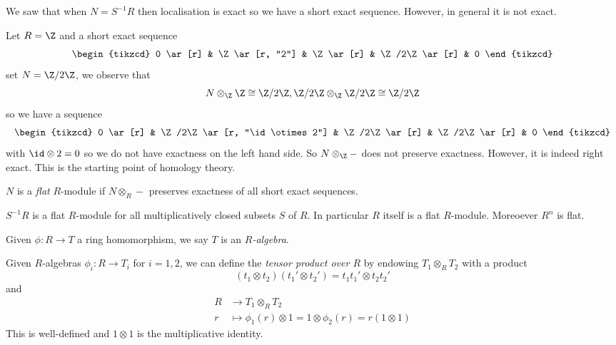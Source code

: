 \documentclass[a4paper]{article}
\begin{document}
We saw that when \(N = S^{-1}R\) then localisation is exact so we have a short exact sequence. However, in general it is not exact.

\begin{eg}
  Let \(R = \Z\) and a short exact sequence
  \[
    \begin{tikzcd}
      0 \ar[r] & \Z \ar[r, "2"] & \Z \ar[r] & \Z/2\Z \ar[r] & 0
    \end{tikzcd}
  \]
  set \(N = \Z/2\Z\), we observe that
  \[
    N \otimes_\Z \Z \cong \Z/2\Z, \Z/2\Z \otimes_\Z \Z/2\Z \cong \Z/2\Z
  \]
  so we have a sequence
  \[
    \begin{tikzcd}
      0 \ar[r] & \Z/2\Z \ar[r, "\id \otimes 2"] & \Z/2\Z \ar[r] & \Z/2\Z \ar[r] & 0
    \end{tikzcd}
  \]
  with \(\id \otimes 2 = 0\) so we do not have exactness on the left hand side. So \(N \otimes_\Z -\) does not preserve exactness. However, it is indeed right exact. This is the starting point of homology theory.
\end{eg}

\begin{definition}
  \(N\) is a \emph{flat} \(R\)-module if \(N \otimes_R -\) preserves exactness of all short exact sequences.
\end{definition}

\begin{eg}
  \(S^{-1}R\) is a flat \(R\)-module for all multiplicatively closed subsets \(S\) of \(R\). In particular \(R\) itself is a flat \(R\)-module. Moreoever \(R^n\) is flat.
\end{eg}

\begin{definition}[algebra]
  Given \(\phi: R \to T\) a ring homomorphism, we say \(T\) is an \emph{\(R\)-algebra}.
\end{definition}

\begin{definition}
  Given \(R\)-algebras \(\phi_i: R \to T_i\) for \(i = 1, 2\), we can define the \emph{tensor product over \(R\)} by endowing \(T_1 \otimes_R T_2\) with a product
  \[
    (t_1 \otimes t_2) (t_1' \otimes t_2') = t_1t_1' \otimes t_2t_2'
  \]
  and
  \begin{align*}
    R &\to T_1 \otimes_R T_2 \\
    r &\mapsto \phi_1(r) \otimes 1 = 1 \otimes \phi_2(r) = r(1 \otimes 1)
  \end{align*}
  This is well-defined and \(1 \otimes 1\) is the multiplicative identity.
\end{definition}
\end{document}
